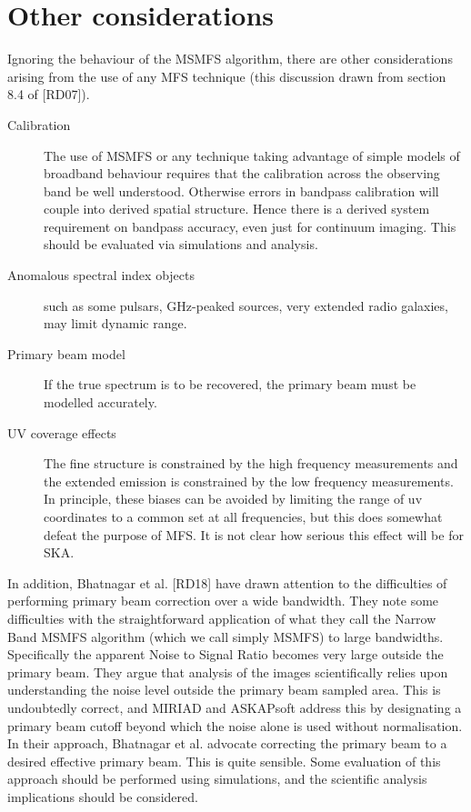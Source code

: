 \documentclass[11pt,a4paper,variablewidth]{article}
\begin{document}
\clearpage
\section{Other considerations}
\label{sec:other}

Ignoring the behaviour of the MSMFS algorithm, there are other considerations arising from the use of any MFS technique (this discussion drawn from section 8.4 of [RD07]).

\begin{description}
\item[Calibration]	
The use of MSMFS or any technique taking advantage of simple models of broadband behaviour requires that the calibration across the observing band be well understood. Otherwise errors in bandpass calibration will couple into derived spatial structure. Hence there is a derived system requirement on bandpass accuracy, even just for continuum imaging. This should be evaluated via simulations and analysis.
\item[Anomalous spectral index objects] such as some pulsars, GHz-peaked sources, very extended radio galaxies, may limit dynamic range.
\item[Primary beam model] If the true spectrum is to be recovered, the primary beam must be modelled accurately.
\item[UV coverage effects] The fine structure is constrained by the high frequency measurements and the extended emission is constrained by the low frequency measurements. In principle, these biases can be avoided by limiting the range of uv coordinates to a common set at all frequencies, but this does somewhat defeat the purpose of MFS. It is not clear how serious this effect will be for SKA.
\end{description}

In addition, Bhatnagar et al. [RD18] have drawn attention to the difficulties of performing primary beam correction over a wide bandwidth. They note some difficulties with the straightforward application of what they call the Narrow Band MSMFS algorithm (which we call simply MSMFS) to large bandwidths. Specifically the apparent Noise to Signal Ratio becomes very large outside the primary beam. They argue that analysis of the images scientifically relies upon understanding the noise level outside the primary beam sampled area. This is undoubtedly correct, and MIRIAD and ASKAPsoft address this by designating a primary beam cutoff beyond which the noise alone is used without normalisation. In their approach, Bhatnagar et al. advocate correcting the primary beam to a desired effective primary beam. This is quite sensible. Some evaluation of this approach should be performed using simulations, and the scientific analysis implications should be considered.
\end{document}
